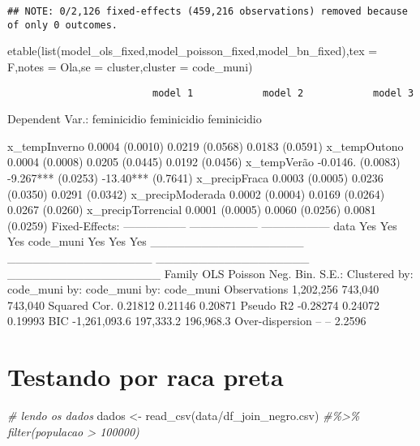 \documentclass[
]{article}
\newenvironment{Shaded}{\begin{snugshade}}{\end{snugshade}}
\newcommand{\AttributeTok}[1]{\textcolor[rgb]{0.77,0.63,0.00}{#1}}
\newcommand{\CommentTok}[1]{\textcolor[rgb]{0.56,0.35,0.01}{\textit{#1}}}
\newcommand{\FunctionTok}[1]{\textcolor[rgb]{0.00,0.00,0.00}{#1}}
\newcommand{\NormalTok}[1]{#1}
\newcommand{\OtherTok}[1]{\textcolor[rgb]{0.56,0.35,0.01}{#1}}
\newcommand{\StringTok}[1]{\textcolor[rgb]{0.31,0.60,0.02}{#1}}
\begin{document}
\begin{verbatim}
## NOTE: 0/2,126 fixed-effects (459,216 observations) removed because of only 0 outcomes.
\end{verbatim}

\begin{Shaded}
\begin{Highlighting}[]
\FunctionTok{etable}\NormalTok{(}\FunctionTok{list}\NormalTok{(model\_ols\_fixed,model\_poisson\_fixed,model\_bn\_fixed),}\AttributeTok{tex =}\NormalTok{ F,}\AttributeTok{notes =} \StringTok{\textquotesingle{}Ola\textquotesingle{}}\NormalTok{,}\AttributeTok{se =} \StringTok{\textquotesingle{}cluster\textquotesingle{}}\NormalTok{,}\AttributeTok{cluster =} \StringTok{\textquotesingle{}code\_muni\textquotesingle{}}\NormalTok{)}
\end{Highlighting}
\end{Shaded}

\begin{verbatim}
                         model 1            model 2            model 3
\end{verbatim}

Dependent Var.: feminicidio feminicidio feminicidio

x\_tempInverno 0.0004 (0.0010) 0.0219 (0.0568) 0.0183 (0.0591)
x\_tempOutono 0.0004 (0.0008) 0.0205 (0.0445) 0.0192 (0.0456)
x\_tempVerão -0.0146. (0.0083) -9.267*** (0.0253) -13.40*** (0.7641)
x\_precipFraca 0.0003 (0.0005) 0.0236 (0.0350) 0.0291 (0.0342)
x\_precipModerada 0.0002 (0.0004) 0.0169 (0.0264) 0.0267 (0.0260)
x\_precipTorrencial 0.0001 (0.0005) 0.0060 (0.0256) 0.0081 (0.0259)
Fixed-Effects: ----------------- ------------------ ------------------
data Yes Yes Yes code\_muni Yes Yes Yes
\_\_\_\_\_\_\_\_\_\_\_\_\_\_\_\_\_\_ \_\_\_\_\_\_\_\_\_\_\_\_\_\_\_\_\_
\_\_\_\_\_\_\_\_\_\_\_\_\_\_\_\_\_\_
\_\_\_\_\_\_\_\_\_\_\_\_\_\_\_\_\_\_ Family OLS Poisson Neg. Bin. S.E.:
Clustered by: code\_muni by: code\_muni by: code\_muni Observations
1,202,256 743,040 743,040 Squared Cor. 0.21812 0.21146 0.20871 Pseudo R2
-0.28274 0.24072 0.19993 BIC -1,261,093.6 197,333.2 196,968.3
Over-dispersion -- -- 2.2596

\hypertarget{testando-por-raca-preta}{%
\section{Testando por raca preta}\label{testando-por-raca-preta}}

\begin{Shaded}
\begin{Highlighting}[]
\CommentTok{\# lendo os dados}
\NormalTok{dados }\OtherTok{\textless{}{-}} \FunctionTok{read\_csv}\NormalTok{(}\StringTok{\textquotesingle{}data/df\_join\_negro.csv\textquotesingle{}}\NormalTok{) }\CommentTok{\#\%\textgreater{}\% filter(populacao \textgreater{} 100000)}
\end{Highlighting}
\end{Shaded}
\end{document}
